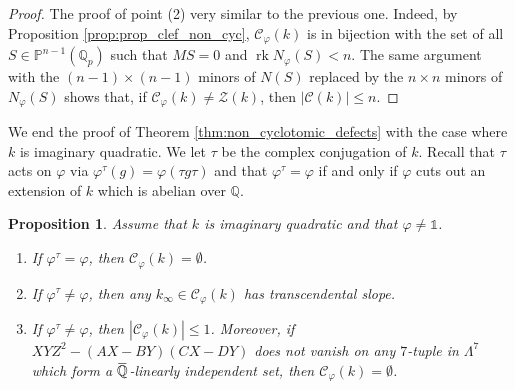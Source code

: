 \documentclass[12pt]{amsart}
\newcommand{\Q}{\mathbb{Q}}
\newcommand\bQ{\mathbb{Q}}
\newcommand\bP{\mathbb{P}}
\newcommand\Qp{{\mathbb{Q}_p}}
\newcommand\sC{\mathscr{C}}
\newcommand\sZ{\mathscr{Z}}
\newcommand{\ob}[1]{\mkern 1.5mu\overline{\mkern-1.5mu#1\mkern-1.5mu}\mkern 1.5mu}
\DeclareMathOperator{\rk}{rk}
\theoremstyle{defstyle}
\theoremstyle{thmstyle}
\newtheorem{proposition}[subsubsection]{Proposition}
\begin{document}
\begin{proof}
		The proof of point (2) very similar to the previous one. Indeed, by Proposition \ref{prop:prop_clef_non_cyc}, $\sC_\varphi(k)$ is in bijection with the set of all $S\in \bP^{n-1}(\Qp)$ such that $MS=0$ and $\rk N_\varphi(S)<n$. The same argument with the $(n-1)\times(n-1)$ minors of $N(S)$ replaced by the $n\times n$ minors of $N_\varphi(S)$ shows that, if $\sC_\varphi(k)\neq \sZ(k)$, then $|\sC(k)|\leq n$.
	\end{proof}
	
	We end the proof of Theorem \ref{thm:non_cyclotomic_defects} with the case where $k$ is imaginary quadratic. We let $\tau$ be the complex conjugation of $k$. Recall that $\tau$ acts on $\varphi$ via $\varphi^\tau(g)=\varphi(\tau g \tau)$ and that $\varphi^\tau=\varphi$ if and only if $\varphi$ cuts out an extension of $k$ which is abelian over $\Q$.
	\begin{proposition}\label{prop:non_cyc_non_trivial_char}
		Assume that $k$ is imaginary quadratic and that $\varphi\neq \mathds{1}$. 
		\begin{enumerate}
			\item If $\varphi^\tau=\varphi$, then $\sC_\varphi(k)=\emptyset$.
			\item If $\varphi^\tau\neq\varphi$, then any $k_\infty\in \sC_\varphi(k)$ has transcendental slope. 
			\item If $\varphi^\tau\neq\varphi$, then $|\sC_\varphi(k)|\leq 1$. Moreover, if
			$XYZ^2-(AX-BY)(CX-DY)$
			does not vanish on any $7$-tuple in $\Lambda^7$ which form a $\ob{\bQ}$-linearly independent set, then $\sC_\varphi(k)=\emptyset$.
		\end{enumerate}
	\end{proposition}
\end{document}
